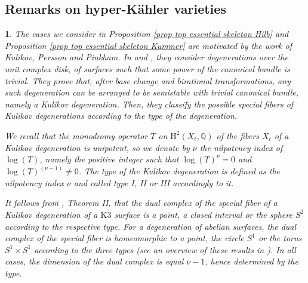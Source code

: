 \documentclass{amsart}%
\numberwithin{equation}{subsection}
\theoremstyle{plain2}
\theoremstyle{definition2}
\theoremstyle{stepstyle}
\theoremstyle{point}
\theoremstyle{subpoint}
\newtheorem{subpoint}[equation]{}%
\newcommand{\spa}[1]{\begin{subpoint}#1\end{subpoint}}           %
\newcommand{\Q}{\ensuremath{\mathbb{Q}}}
\begin{document}
\subsection{Remarks on hyper-K{\"a}hler varieties} 
\spa{The cases we consider in Proposition \ref{prop top essential skeleton Hilb} and Proposition \ref{prop top essential skeleton Kummer} are motivated by the work of Kulikov, Persson and Pinkham. In \cite{Kulikov} and \cite{PerssonPinkham1981}, they consider degenerations  over the unit complex disk, of surfaces such that some power of the canonical bundle is trivial. They prove that, after base change and birational transformations, any such degeneration can be arranged to be semistable with trivial canonical bundle, namely a \emph{Kulikov degeneration}. Then, they classify the possible special fibers of Kulikov degenerations according to the type of the degeneration.

We recall that the monodromy operator $T$ on $\text{H}^2(X_t, \Q)$ of the fibers $X_t$ of a Kulikov degeneration is unipotent, so we denote by $\nu$ the nilpotency index of $\log(T)$, namely the positive integer such that $\log(T)^\nu=0$ and $\log(T)^{(\nu-1)} \neq 0$. The type of the Kulikov degeneration is defined as the nilpotency index $\nu$ and called type I, II or III accordingly to it.

It follows from \cite{Kulikov}, Theorem II, that the dual complex of the special fiber of a Kulikov degeneration of a $\text{K}3$ surface is a point, a closed interval or the sphere $S^2$ according to the respective type. For a degeneration of abelian surfaces, the dual complex of the special fiber is homeomorphic to a point, the circle $S^1$ or the torus $S^1 \times S^1$ according to the three types (see an overview of these results in \cite{FriedmanMorrison}). In all cases, the dimension of the dual complex is equal $\nu-1$, hence determined by the type.
}
\end{document}
